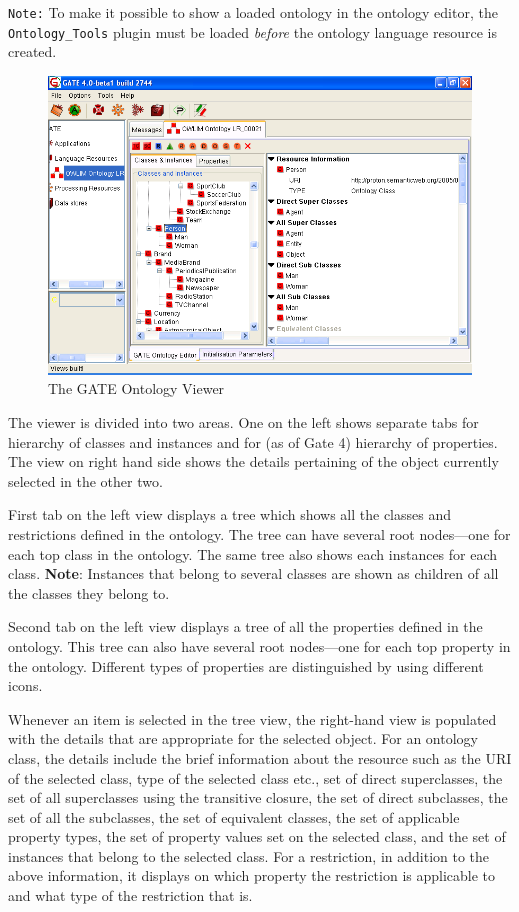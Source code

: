 {\texttt{Note:} To make it possible to show a loaded ontology in the ontology
editor, the \verb!Ontology_Tools! plugin must be loaded
\emph{before} the ontology language resource is created.


\begin{figure}[htbp]
\begin{center}
\includegraphics[scale=0.5]{ontology-vr.png}
\caption{The GATE Ontology Viewer}
\label{fig:ontology-vr}
\end{center}
\end{figure}


The viewer is divided into two areas. One on the left shows separate tabs for
hierarchy of classes and instances and for (as of Gate 4) hierarchy of
properties. The view on right hand side shows the details pertaining of the
object currently selected in the other two.

First tab on the left view displays a tree which shows all the classes and
restrictions defined in the ontology. The tree can have several root
nodes---one for each top class in the ontology. The same tree also shows each
instances for each class. \textbf{Note}: Instances that belong to several classes are shown as children
of all the classes they belong to.

Second tab on the left view displays a tree of all the properties defined in the
ontology. This tree can also have several root nodes---one for each top property
in the ontology.  Different types of properties are distinguished by using
different icons.

Whenever an item is selected in the tree view, the right-hand view is populated with
the details that are appropriate for the selected object. For an ontology class, the
details include the brief information about the resource such as the URI of the
selected class, type of the selected class etc., set of direct superclasses, the
set of all superclasses using the transitive closure, the set of direct
subclasses, the set of all the subclasses, the set of equivalent classes, the
set of applicable property types, the set of property values set on the selected
class, and the set of instances that belong to the selected class. For a
restriction, in addition to the above information, it displays on which
property the restriction is applicable to and  what type of the restriction
that is.

}
